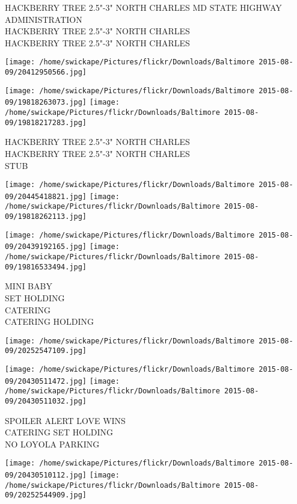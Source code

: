 \documentclass[10pt,letterpaper]{article}
\begin{document}
HACKBERRY TREE 2.5"{-}3" NORTH CHARLES MD STATE HIGHWAY ADMINISTRATION\\
HACKBERRY TREE 2.5"{-}3" NORTH CHARLES\\
HACKBERRY TREE 2.5"{-}3" NORTH CHARLES\\
\pagebreak

\texttt{[image: /home/swickape/Pictures/flickr/Downloads/Baltimore 2015-08-09/20412950566.jpg]}

\vspace{0.25in}
\texttt{[image: /home/swickape/Pictures/flickr/Downloads/Baltimore 2015-08-09/19818263073.jpg]}
\texttt{[image: /home/swickape/Pictures/flickr/Downloads/Baltimore 2015-08-09/19818217283.jpg]}

HACKBERRY TREE 2.5"{-}3" NORTH CHARLES\\
HACKBERRY TREE 2.5"{-}3" NORTH CHARLES\\
STUB\\
\pagebreak

\texttt{[image: /home/swickape/Pictures/flickr/Downloads/Baltimore 2015-08-09/20445418821.jpg]}
\texttt{[image: /home/swickape/Pictures/flickr/Downloads/Baltimore 2015-08-09/19818262113.jpg]}

\texttt{[image: /home/swickape/Pictures/flickr/Downloads/Baltimore 2015-08-09/20439192165.jpg]}
\texttt{[image: /home/swickape/Pictures/flickr/Downloads/Baltimore 2015-08-09/19816533494.jpg]}

MINI BABY\\
SET HOLDING\\
CATERING\\
CATERING HOLDING\\
\pagebreak

\texttt{[image: /home/swickape/Pictures/flickr/Downloads/Baltimore 2015-08-09/20252547109.jpg]}

\vspace{0.25in}
\texttt{[image: /home/swickape/Pictures/flickr/Downloads/Baltimore 2015-08-09/20430511472.jpg]}
\texttt{[image: /home/swickape/Pictures/flickr/Downloads/Baltimore 2015-08-09/20430511032.jpg]}

SPOILER ALERT LOVE WINS\\
CATERING SET HOLDING\\
NO LOYOLA PARKING\\
\pagebreak

\texttt{[image: /home/swickape/Pictures/flickr/Downloads/Baltimore 2015-08-09/20430510112.jpg]}
\texttt{[image: /home/swickape/Pictures/flickr/Downloads/Baltimore 2015-08-09/20252544909.jpg]}
\end{document}
